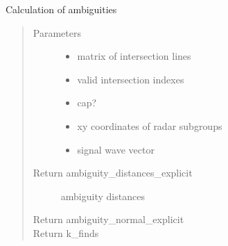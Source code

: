 \documentclass[letterpaper,10pt,english]{sphinxmanual}
\begin{document}
\begin{fulllineitems}
\label{\detokenize{functions:functions.explicit}}
Calculation of ambiguities
\begin{quote}\begin{description}
\item[{Parameters}] \leavevmode\begin{itemize}
\item {} 
 \textendash{} matrix of intersection lines

\item {} 
 \textendash{} valid intersection indexes

\item {} 
 \textendash{} cap?

\item {} 
 \textendash{} xy coordinates of radar subgroups

\item {} 
 \textendash{} signal wave vector

\end{itemize}

\item[{Return ambiguity\_distances\_explicit}] \leavevmode
ambiguity distances

\item[{Return ambiguity\_normal\_explicit}] \leavevmode
\item[{Return k\_finds}] \leavevmode
\end{description}\end{quote}

\end{fulllineitems}

\end{document}
